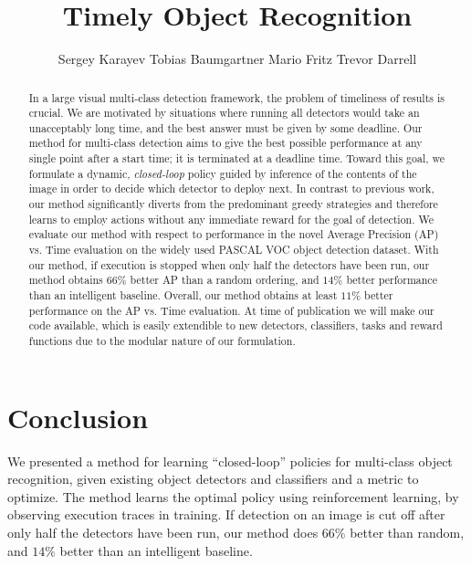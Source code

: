 \documentclass{article} %
\title{Timely Object Recognition}
\author{
Sergey Karayev \And
Tobias Baumgartner \And
Mario Fritz \And
Trevor Darrell
}
\begin{document}
\maketitle

\begin{abstract}
In a large visual multi-class detection framework, the problem of timeliness of results is crucial.
We are motivated by situations where running all detectors would take an unacceptably long time, and the best answer must be given by some deadline.
Our method for multi-class detection aims to give the best possible performance at any single point after a start time; it is terminated at a deadline time.
Toward this goal, we formulate a dynamic, \emph{closed-loop} policy guided by inference of the contents of the image in order to decide which detector to deploy next.
In contrast to previous work, our method significantly diverts from the predominant greedy strategies and therefore learns to employ actions without any immediate reward for the goal of detection.
We evaluate our method with respect to performance in the novel Average Precision (AP) vs. Time evaluation on the widely used PASCAL VOC object detection dataset.
With our method, if execution is stopped when only half the detectors have been run, our method obtains $66\%$ better AP than a random ordering, and $14\%$ better performance than an intelligent baseline.
Overall, our method obtains at least $11\%$ better performance on the AP vs. Time evaluation. At time of publication we will make our code available, which is easily extendible to new detectors, classifiers, tasks and reward functions due to the modular nature of our formulation.
\end{abstract}





\section{Conclusion}
We presented a method for learning ``closed-loop'' policies for multi-class object recognition, given existing object detectors and classifiers and a metric to optimize.
The method learns the optimal policy using reinforcement learning, by observing execution traces in training.
If detection on an image is cut off after only half the detectors have been run, our method does $66\%$ better than random, and $14\%$ better than an intelligent baseline.
\end{document}
